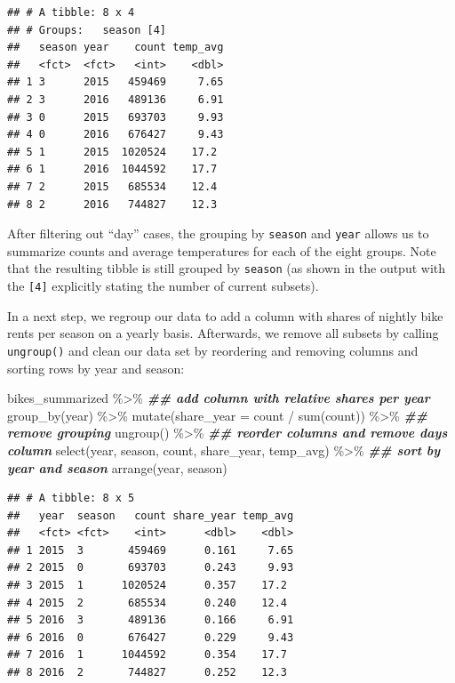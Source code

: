 \documentclass[
]{krantz}
\makeatletter
\newenvironment{Shaded}{\begin{snugshade}}{\end{snugshade}}
\newcommand{\AttributeTok}[1]{\textcolor[rgb]{0.61,0.61,0.61}{#1}}
\newcommand{\DocumentationTok}[1]{\textcolor[rgb]{0.37,0.37,0.37}{\textbf{\textit{#1}}}}
\newcommand{\FunctionTok}[1]{\textcolor[rgb]{0,0,0}{#1}}
\newcommand{\NormalTok}[1]{#1}
\newcommand{\SpecialCharTok}[1]{\textcolor[rgb]{0,0,0}{#1}}
\newenvironment{kframe}{%
\medskip{}
\setlength{\fboxsep}{.8em}
 \def\at@end@of@kframe{}%
 \ifinner\ifhmode%
  \def\at@end@of@kframe{\end{minipage}}%
  \begin{minipage}{\columnwidth}%
 \fi\fi%
 \def\FrameCommand##1{\hskip\@totalleftmargin \hskip-\fboxsep
 \colorbox{shadecolor}{##1}\hskip-\fboxsep
     \hskip-\linewidth \hskip-\@totalleftmargin \hskip\columnwidth}%
 \MakeFramed {\advance\hsize-\width
   \@totalleftmargin\z@ \linewidth\hsize
   \@setminipage}}%
 {\par\unskip\endMakeFramed%
 \at@end@of@kframe}
\renewenvironment{Shaded}{\begin{kframe}}{\end{kframe}}
\makeatother
\begin{document}
\begin{verbatim}
## # A tibble: 8 x 4
## # Groups:   season [4]
##   season year    count temp_avg
##   <fct>  <fct>   <int>    <dbl>
## 1 3      2015   459469     7.65
## 2 3      2016   489136     6.91
## 3 0      2015   693703     9.93
## 4 0      2016   676427     9.43
## 5 1      2015  1020524    17.2 
## 6 1      2016  1044592    17.7 
## 7 2      2015   685534    12.4 
## 8 2      2016   744827    12.3
\end{verbatim}

After filtering out ``day'' cases, the grouping by \texttt{season} and \texttt{year} allows us to summarize counts and average temperatures for each of the eight groups. Note that the resulting tibble is still grouped by \texttt{season} (as shown in the output with the \texttt{{[}4{]}} explicitly stating the number of current subsets).

In a next step, we regroup our data to add a column with shares of nightly bike rents per season on a yearly basis. Afterwards, we remove all subsets by calling \texttt{ungroup()} and clean our data set by reordering and removing columns and sorting rows by year and season:

\begin{Shaded}
\begin{Highlighting}[]
\NormalTok{bikes\_summarized }\SpecialCharTok{\%\textgreater{}\%} 
  \DocumentationTok{\#\# add column with relative shares per year}
  \FunctionTok{group\_by}\NormalTok{(year) }\SpecialCharTok{\%\textgreater{}\%} 
  \FunctionTok{mutate}\NormalTok{(}\AttributeTok{share\_year =}\NormalTok{ count }\SpecialCharTok{/} \FunctionTok{sum}\NormalTok{(count)) }\SpecialCharTok{\%\textgreater{}\%} 
  \DocumentationTok{\#\# remove grouping}
  \FunctionTok{ungroup}\NormalTok{() }\SpecialCharTok{\%\textgreater{}\%} 
  \DocumentationTok{\#\# reorder columns and remove days column}
  \FunctionTok{select}\NormalTok{(year, season, count, share\_year, temp\_avg) }\SpecialCharTok{\%\textgreater{}\%} 
  \DocumentationTok{\#\# sort by year and season}
  \FunctionTok{arrange}\NormalTok{(year, season) }
\end{Highlighting}
\end{Shaded}

\begin{verbatim}
## # A tibble: 8 x 5
##   year  season   count share_year temp_avg
##   <fct> <fct>    <int>      <dbl>    <dbl>
## 1 2015  3       459469      0.161     7.65
## 2 2015  0       693703      0.243     9.93
## 3 2015  1      1020524      0.357    17.2 
## 4 2015  2       685534      0.240    12.4 
## 5 2016  3       489136      0.166     6.91
## 6 2016  0       676427      0.229     9.43
## 7 2016  1      1044592      0.354    17.7 
## 8 2016  2       744827      0.252    12.3
\end{verbatim}
\end{document}
